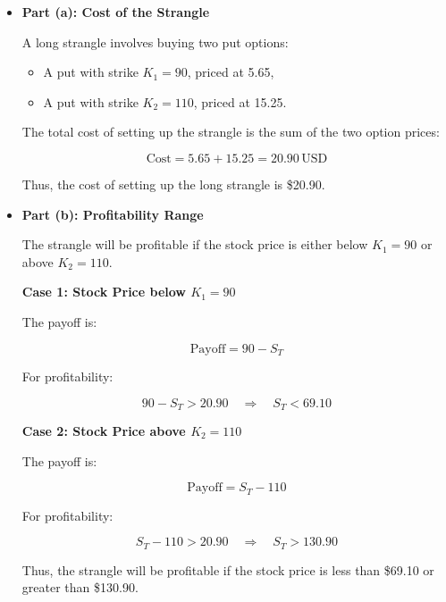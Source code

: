 \documentclass[12pt,letterpaper, onecolumn]{exam}
\begin{document}
\begin{solution}

\begin{itemize}
    \item \textbf{Part (a): Cost of the Strangle}
    
    A long strangle involves buying two put options:
    \begin{itemize}
        \item A put with strike \( K_1 = 90 \), priced at 5.65,
        \item A put with strike \( K_2 = 110 \), priced at 15.25.
    \end{itemize}
    
    The total cost of setting up the strangle is the sum of the two option prices:
    
    \[
    \text{Cost} = 5.65 + 15.25 = 20.90 \, \text{USD}
    \]
    
    Thus, the cost of setting up the long strangle is \$20.90.

    \item \textbf{Part (b): Profitability Range}
    
    The strangle will be profitable if the stock price is either below \( K_1 = 90 \) or above \( K_2 = 110 \).
    
    \textbf{Case 1: Stock Price below \( K_1 = 90 \)}
    
    The payoff is:
    
    \[
    \text{Payoff} = 90 - S_T
    \]
    
    For profitability:
    
    \[
    90 - S_T > 20.90 \quad \Rightarrow \quad S_T < 69.10
    \]
    
    \textbf{Case 2: Stock Price above \( K_2 = 110 \)}
    
    The payoff is:
    
    \[
    \text{Payoff} = S_T - 110
    \]
    
    For profitability:
    
    \[
    S_T - 110 > 20.90 \quad \Rightarrow \quad S_T > 130.90
    \]
    
    Thus, the strangle will be profitable if the stock price is less than \$69.10 or greater than \$130.90.
    
\end{itemize}

\end{solution}

\newpage
\end{document}
